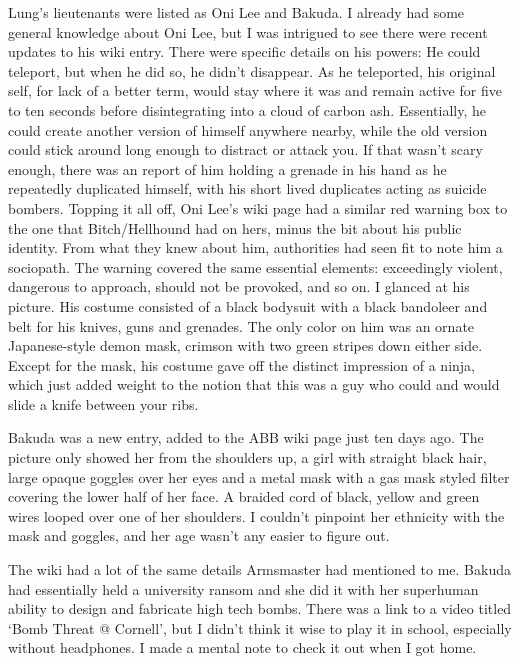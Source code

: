 Lung's lieutenants were listed as Oni Lee and Bakuda.  I already had some general knowledge about Oni Lee, but I was intrigued to see there were recent updates to his wiki entry.  There were specific details on his powers:  He could teleport, but when he did so, he didn't disappear.  As he teleported, his original self, for lack of a better term, would stay where it was and remain active for five to ten seconds before disintegrating into a cloud of carbon ash.  Essentially, he could create another version of himself anywhere nearby, while the old version could stick around long enough to distract or attack you.  If that wasn't scary enough, there was an report of him holding a grenade in his hand as he repeatedly duplicated himself, with his short lived duplicates acting as suicide bombers.  Topping it all off, Oni Lee's wiki page  had a similar red warning box to the one that Bitch/Hellhound had on hers, minus the bit about his public identity.  From what they knew about him, authorities had seen fit to note him a sociopath.  The warning covered the same essential elements: exceedingly violent, dangerous to approach, should not be provoked, and so on.  I glanced at his picture.  His costume consisted of a black bodysuit with a black bandoleer and belt for his knives, guns and grenades.  The only color on him was an ornate Japanese-style demon mask, crimson with two green stripes down either side.  Except for the mask, his costume gave off the distinct impression of a ninja, which just added weight to the notion that this was a guy who could and would slide a knife between your ribs.



Bakuda was a new entry, added to the ABB wiki page just ten days ago.  The picture only showed her from the shoulders up, a girl with straight black hair, large opaque goggles over her eyes and a metal mask with a gas mask styled filter covering the lower half of her face.  A braided cord of black, yellow and green wires looped over one of her shoulders.  I couldn't pinpoint her ethnicity with the mask and goggles, and her age wasn't any easier to figure out.



The wiki had a lot of the same details Armsmaster had mentioned to me.  Bakuda had essentially held a university ransom and she did it with her superhuman ability to design and fabricate high tech bombs.  There was a link to a video titled `Bomb Threat @ Cornell', but I didn't think it wise to play it in school, especially without headphones.  I made a mental note to check it out when I got home.



